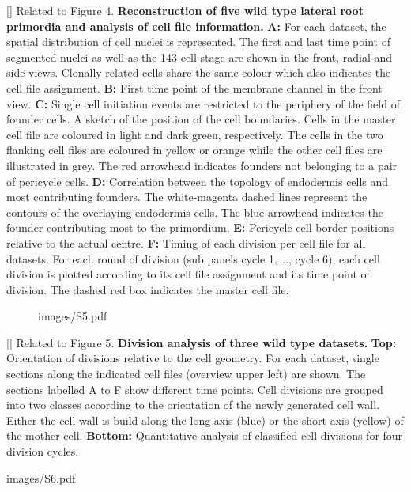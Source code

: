 []{
Related to Figure 4.
{\bf Reconstruction of five wild type lateral root primordia and analysis of cell file information.} {\bf A:} For each dataset, the spatial distribution of cell nuclei is represented. The first and last time point of segmented nuclei as well as the 143-cell stage are shown in the front, radial and side views. Clonally related cells share the same colour which also indicates the cell file assignment. {\bf B:} First time point of the membrane channel in the front view. {\bf C:} Single cell initiation events are restricted to the periphery of the field of founder cells. A sketch of the position of the cell boundaries. Cells in the master cell file are coloured in light and dark green, respectively. The cells in the two flanking cell files are coloured in yellow or orange while the other cell files are illustrated in grey. The red arrowhead indicates founders not belonging to a pair of pericycle cells. {\bf D:} Correlation between the topology of endodermis cells and most contributing founders. The white-magenta dashed lines represent the contours of the overlaying endodermis cells. The blue arrowhead indicates the founder contributing most to the primordium. {\bf E:} Pericycle cell border positions relative to the actual centre. {\bf F:} Timing of each division per cell file for all datasets. For each round of division (sub panels cycle 1$, \ldots$, cycle 6), each cell division is plotted according to its cell file assignment and its time point of division. The dashed red box indicates the master cell file.
}
\label{fig:S4}
%
\clearpage
%
\begin{figure}[htbp]
\centering
	\begin{overpic}[width=1.\linewidth]{images/S5.pdf}
	\end{overpic}
\end{figure}
\clearpage
{}[]{
Related to Figure 5.
{\bf Division analysis of three wild type datasets.} {\bf Top:} Orientation of divisions relative to the cell geometry. For each dataset, single sections along the indicated cell files (overview upper left) are shown. The sections labelled A to F show different time points. Cell divisions are grouped into two classes according to the orientation of the newly generated cell wall. Either the cell wall is build along the long axis (blue) or the short axis (yellow) of the mother cell. {\bf Bottom:} Quantitative analysis of classified cell divisions for four division cycles.
}
\label{fig:S5}
%
\clearpage
%
\begin{sidewaysfigure}
\centering
	\begin{overpic}[width=1.\linewidth]{images/S6.pdf}
	\end{overpic}
\end{sidewaysfigure}
